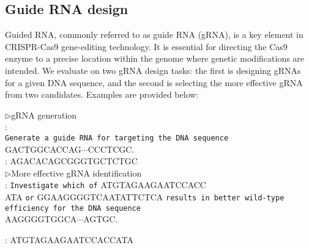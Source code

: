
\subsection{Guide RNA design}
Guided RNA, commonly referred to as guide RNA (gRNA), is a key element in CRISPR-Cas9 gene-editing technology. It is essential for directing the Cas9 enzyme to a precise location within the genome where genetic modifications are intended. We evaluate \ourM{} on two gRNA design tasks: the first is designing gRNAs for a given DNA sequence, and the second is selecting the more effective gRNA from two candidates. Examples are provided below:

\begin{example}
\noindent$\rhd$gRNA generation\\
: \\
\texttt{Generate a guide RNA for targeting the DNA sequence} \\
\dna{}GACTGGCACCAG$\cdots$CCCTCGC\edna{}.\\	
: \rna{}AGACACAGCGGGTGCTCTGC\erna{}\\


\noindent$\rhd$More effective gRNA identification\\
: 
\noindent \texttt{Investigate which of} \rna{}ATGTAGAAGAATCCACC\\
ATA\erna{} 
\texttt{or} \rna{}GGAAGGGGTCAATATTCTCA\erna{} \texttt{results in better wild-type efficiency for the DNA sequence} \\
\dna{}AAGGGGTGGCA$\cdots$AGTGC\edna{}.	

: \rna{}ATGTAGAAGAATCCACCATA\erna{}
\end{example}

